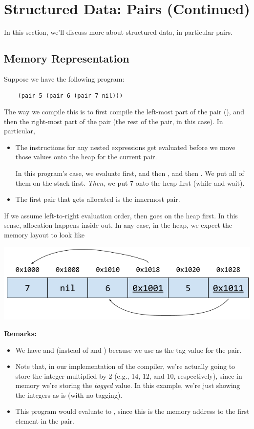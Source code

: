 \documentclass[letterpaper]{article}
\begin{document}
\section{Structured Data: Pairs (Continued)}
In this section, we’ll discuss more about structured data, in particular pairs.

\subsection{Memory Representation}
Suppose we have the following program: 
\begin{verbatim}
    (pair 5 (pair 6 (pair 7 nil)))\end{verbatim}
The way we compile this is to first compile the left-most part of the pair (), and then the right-most part of the pair (the rest of the pair, in this case). In particular,
\begin{itemize}
    \item The instructions for any nested expressions get evaluated before we move those values onto the heap for the current pair.
    \begin{mdframed}
        In this program's case, we evaluate  first, and then , and then . We put all of them on the stack first. \emph{Then}, we put 7 onto the heap first (while  and  wait). 
    \end{mdframed}
    
    \item The first pair that gets allocated is the innermost pair. 
\end{itemize}
If we assume left-to-right evaluation order, then  goes on the heap first. In this sense, allocation happens inside-out. In any case, in the heap, we expect the memory layout to look like
\begin{center}
    \includegraphics[scale=0.67]{../assets/pair_heap.png}
\end{center}
\textbf{Remarks:} 
\begin{itemize}
    \item We have  and  (instead of  and ) because we use  as the tag value for the pair.
    \item Note that, in our implementation of the compiler, we're actually going to store the integer multiplied by 2 (e.g., 14, 12, and 10, respectively), since in memory we're storing the \emph{tagged} value. In this example, we're just showing the integers as is (with no tagging).
    \item This program would evaluate to , since this is the memory address to the first element in the pair. 
\end{itemize}
\end{document}
